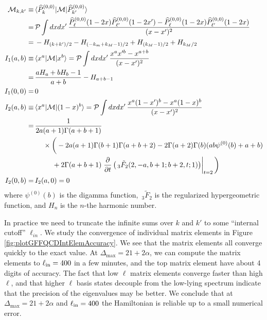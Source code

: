 \documentclass[12pt]{article}
\def\>{\rangle}
\def\<{\langle}
\renewcommand{\d}{\partial}
\newcommand{\CM}{{\cal M}}
\newcommand{\nn}{\nonumber}
\newcommand\De\Delta
\newcommand{\dmax}{\De_{\max}}
\begin{document}
    \begin{align}
    \CM_{k,k'}\equiv& \,
    \< \widehat{P}_{k}^{(0,0)} | \CM | \widehat{P}_{k'}^{(0,0)} \>
    \nn \\
    =& \, \mathcal{P} \int dx dx' \,
    \frac{\widehat{P}_{\ell}^{(0,0)}(1-2x)
    \widehat{P}_{\ell'}^{(0,0)}(1-2x')
    - \widehat{P}_{\ell}^{(0,0)}(1-2x)
    \widehat{P}_{\ell'}^{(0,0)}(1-2x)
    }{(x-x')^2} \nn \\
    =& \,
    -H_{ \left(k+k'\right)/2}-H_{
       \left(-k_m+k_M-1\right)/2}+
       H_{\left(k_M-1\right)/2}+H_{k_M/2} \\
    I_1(a,b) \equiv& \,
    \< x^a | \CM | x^b \> = \mathcal{P}
     \int dx dx' \, \frac{
            x^a x'^b - x^{a+b}
        }{(x-x')^2} \nn \\
       =& \, \frac{a H_a+b H_b-1}{a+b} - H_{a+b-1} \, 
    \\
    I_1(0,0) =& \, 0 \\
    I_2(a,b) \equiv& \,
    \< x^a | \CM | (1-x)^b \> = 
    \mathcal{P}\int dx dx' \, \frac{
        x^a (1-x')^b 
        - x^a (1-x)^b 
    }{(x-x')^2} 
    \nn \\
    =&\,\frac{1}
       {2 a (a+1) \Gamma (a+b+1)}  \nn \\
    &~~~~\times\bigg(
    -2 a (a+1) 
     \Gamma (b+1) \Gamma (a+b+2) 
    -2 \Gamma
       (a+2) \Gamma (b) (a b \psi ^{(0)}(b)+a+b)
     \nn \\
    &~~~~~~~~ +2 \Gamma (a+b+1)
     \left.\frac{\d}{\d t}\left(
     \, _3\tilde{F}_2(2,-a,b+1;b+2,t;1)
     \right)\right|_{t=2}
    \bigg) \\
    I_2(0,b) =& \, I_2(a,0) = 0 \, 
    \end{align}
    where $\psi^{(0)}(b)$ is the digamma function, $\, _3\tilde{F}_2$ is the regularized hypergeometric function, and $H_n$ is the $n$-the harmonic number.

    In practice we need to truncate the infinite sums over $k$ and $k'$ to some ``internal cutoff'' $\ell_{in}$. 
    We study the convergence of individual matrix elements in Figure \ref{fig:plotGFFQCDIntElemAccuracy}. 
    We see that the matrix elements all converge quickly to the exact value. At $\dmax = 21+2\alpha$, we can compute the matrix elements to $\ell_{\rm in} = 400$ in a few minutes, and the top matrix element have about 4 digits of accuracy. The fact that low $\ell$ matrix elements converge faster than high $\ell$, and that higher $\ell$ basis states decouple from the low-lying spectrum indicate that the precision of the eigenvalues may be better. We conclude that at $\dmax = 21+2\alpha$ and $\ell_{\rm in} = 400$ the Hamiltonian is reliable up to a small numerical error.
\end{document}
